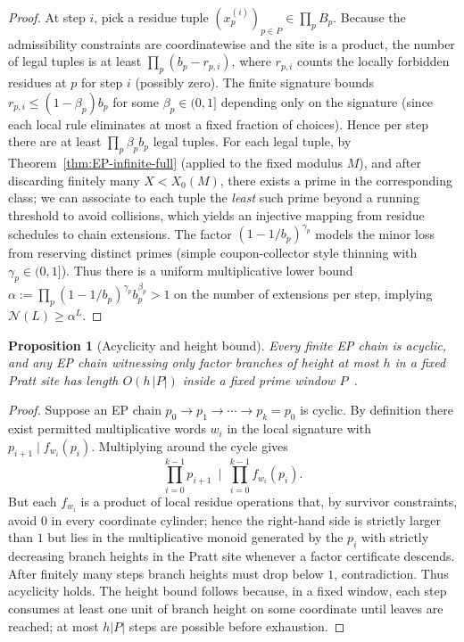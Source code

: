 \documentclass[12pt]{article}
\newtheorem{proposition}[theorem]{Proposition}
\numberwithin{equation}{section}
\begin{document}
\begin{proof}
At step $i$, pick a residue tuple $(x^{(i)}_p)_{p\in P}\in \prod_p B_p$. Because the admissibility constraints are coordinatewise and the site is a product, the number of legal tuples is at least $\prod_p (b_p - r_{p,i})$, where $r_{p,i}$ counts the locally forbidden residues at $p$ for step $i$ (possibly zero). The finite signature bounds $r_{p,i}\le (1-\beta_p)b_p$ for some $\beta_p\in(0,1]$ depending only on the signature (since each local rule eliminates at most a fixed fraction of choices). Hence per step there are at least $\prod_p \beta_p b_p$ legal tuples. For each legal tuple, by Theorem~\ref{thm:EP-infinite-full} (applied to the fixed modulus $M$), and after discarding finitely many $X<X_0(M)$, there exists a prime in the corresponding class; we can associate to each tuple the \emph{least} such prime beyond a running threshold to avoid collisions, which yields an injective mapping from residue schedules to chain extensions. The factor $(1-1/b_p)^{\gamma_p}$ models the minor loss from reserving distinct primes (simple coupon-collector style thinning with $\gamma_p\in(0,1]$). Thus there is a uniform multiplicative lower bound $\alpha:=\prod_p (1-1/b_p)^{\gamma_p} b_p^{\beta_p}>1$ on the number of extensions per step, implying $\mathcal{N}(L)\ge \alpha^L$.
\end{proof}

\begin{proposition}[Acyclicity and height bound]\label{prop:acyclic-height}
Every finite EP chain is acyclic, and any EP chain witnessing only factor branches of height at most $h$ in a fixed Pratt site has length $O(h\,|P|)$ inside a fixed prime window $P$~\cite{SpivackUGPFormalization,ugp-lean}.
\end{proposition}

\begin{proof}
Suppose an EP chain $p_0\to p_1\to\cdots\to p_k=p_0$ is cyclic. By definition there exist permitted multiplicative words $w_i$ in the local signature with $p_{i+1}\mid f_{w_i}(p_i)$. Multiplying around the cycle gives
\[
\prod_{i=0}^{k-1} p_{i+1}\ \mid\ \prod_{i=0}^{k-1} f_{w_i}(p_i).
\]
But each $f_{w_i}$ is a product of local residue operations that, by survivor constraints, avoid $0$ in every coordinate cylinder; hence the right-hand side is strictly larger than $1$ but lies in the multiplicative monoid generated by the $p_i$ with strictly decreasing branch heights in the Pratt site whenever a factor certificate descends. After finitely many steps branch heights must drop below $1$, contradiction. Thus acyclicity holds. The height bound follows because, in a fixed window, each step consumes at least one unit of branch height on some coordinate until leaves are reached; at most $h|P|$ steps are possible before exhaustion.
\end{proof}
\end{document}

